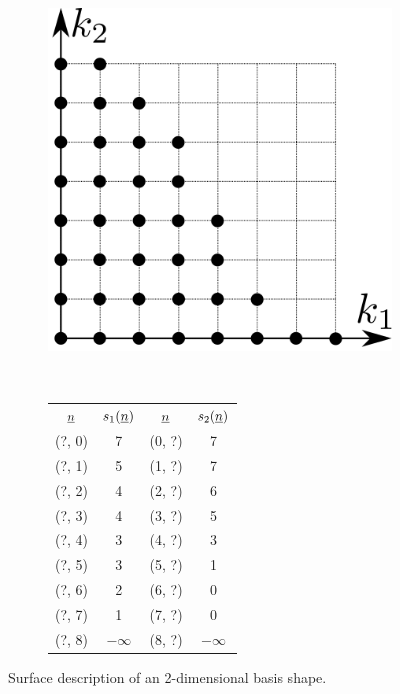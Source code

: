 \documentclass{article}
\begin{document}
\begin{figure}[H]
  \centering
  \begin{subfigure}[]{0.4\textwidth}
    \includegraphics[width=1.0\textwidth]{shape_example}
    \label{fig:shape_example}
  \end{subfigure}
  ~
  \begin{subfigure}[]{0.5\textwidth}
    \begin{tabular}{|| c | c || c | c ||}
      \(\underline{n}\) & \(s_1(\underline{n})\) & \(\underline{n}\) & \(s_2(\underline{n})\) \\
      (?, 0) & 7 & (0, ?) & 7 \\
      (?, 1) & 5 & (1, ?) & 7 \\
      (?, 2) & 4 & (2, ?) & 6 \\
      (?, 3) & 4 & (3, ?) & 5 \\
      (?, 4) & 3 & (4, ?) & 3 \\
      (?, 5) & 3 & (5, ?) & 1 \\
      (?, 6) & 2 & (6, ?) & 0 \\
      (?, 7) & 1 & (7, ?) & 0 \\
      (?, 8) & \(-\infty\) & (8, ?) & \(-\infty\) \\
    \end{tabular}
  \end{subfigure}
  \caption{Surface description of an 2-dimensional basis shape.}
\end{figure}
\end{document}
